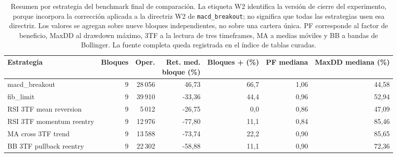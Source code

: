 \begin{table}[H]
\centering
\scriptsize
\setlength{\tabcolsep}{3pt}
\begin{tabular}{lrrrrrr}
\hline
Estrategia & Bloques & Oper. & \shortstack{Ret. med.\\bloque (\%)} & Bloques + (\%) & PF mediana & MaxDD mediana (\%) \\
\hline
macd\_breakout & 9 & 28\,056 & 46,73 & 66,7 & 1,06 & 44,58 \\
fib\_limit & 9 & 39\,910 & -33,36 & 44,4 & 0,96 & 52,94 \\
RSI 3TF mean reversion & 9 & 5\,012 & -26,75 & 0,0 & 0,86 & 47,09 \\
RSI 3TF momentum reentry & 9 & 12\,976 & -77,80 & 11,1 & 0,84 & 85,46 \\
MA cross 3TF trend & 9 & 13\,588 & -73,74 & 22,2 & 0,90 & 85,65 \\
BB 3TF pullback reentry & 9 & 22\,302 & -58,88 & 11,1 & 0,90 & 72,36 \\
\hline
\end{tabular}
\caption[Resumen por estrategia del benchmark final]{Resumen por estrategia del benchmark final de comparaci\'on. La etiqueta W2 identifica la versi\'on de cierre del experimento, porque incorpora la correcci\'on aplicada a la directriz W2 de \texttt{macd\_breakout}; no significa que todas las estrategias usen esa directriz. Los valores se agregan sobre nueve bloques independientes, no sobre una cartera \'unica. PF corresponde al factor de beneficio, MaxDD al drawdown m\'aximo, 3TF a la lectura de tres timeframes, MA a medias m\'oviles y BB a bandas de Bollinger. La fuente completa queda registrada en el \'indice de tablas curadas.}
\label{tab:benchmarks-w2-resumen-estrategia}
\end{table}
